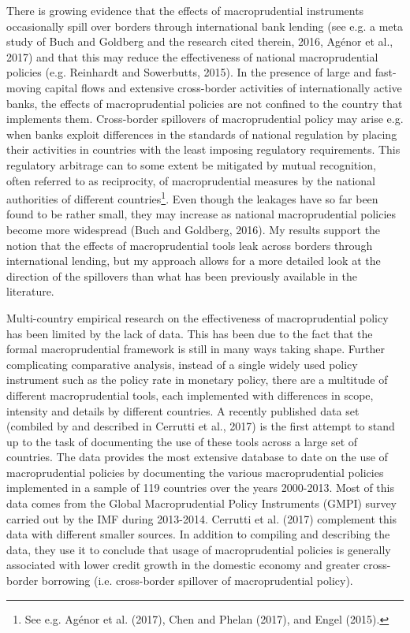 \documentclass[12pt,a4paper]{article}
\begin{document}
There is growing evidence that the effects of macroprudential instruments occasionally spill over borders through international bank lending (see e.g. a meta study of Buch and Goldberg and the research cited therein, 2016, Agénor et al., 2017) and that this may reduce the effectiveness of national macroprudential policies (e.g. Reinhardt and Sowerbutts, 2015). In the presence of large and fast-moving capital flows and extensive cross-border activities of internationally active banks, the effects of macroprudential policies are not confined to the country that implements them. Cross-border spillovers of macroprudential policy may arise e.g. when banks exploit differences in the standards of national regulation by placing their activities in countries with the least imposing regulatory requirements. This regulatory arbitrage can to some extent be mitigated by mutual recognition, often referred to as reciprocity, of macroprudential measures by the national authorities of different countries\footnote{See e.g. Agénor et al. (2017), Chen and Phelan (2017), and Engel (2015).}. Even though the leakages have so far been found to be rather small, they may increase as national macroprudential policies become more widespread (Buch and Goldberg, 2016). My results support the notion that the effects of macroprudential tools leak across borders through international lending, but my approach allows for a more detailed look at the direction of the spillovers than what has been previously available in the literature.

Multi-country empirical research on the effectiveness of macroprudential policy has been limited by the lack of data. This has been due to the fact that the formal macroprudential framework is still in many ways taking shape. Further complicating comparative analysis, instead of a single widely used policy instrument such as the policy rate in monetary policy, there are a multitude of different macroprudential tools, each implemented with differences in scope, intensity and details by different countries. A recently published data set (combiled by and described in Cerrutti et al., 2017) is the first attempt to stand up to the task of documenting the use of these tools across a large set of countries. The data provides the most extensive database to date on the use of macroprudential policies by documenting the various macroprudential policies implemented in a sample of 119 countries over the years 2000-2013. Most of this data comes from the Global Macroprudential Policy Instruments (GMPI) survey carried out by the IMF during 2013-2014. Cerrutti et al. (2017) complement this data with different smaller sources. In addition to compiling and describing the data, they use it to conclude that usage of macroprudential policies is generally associated with lower credit growth in the domestic economy and greater cross-border borrowing (i.e. cross-border spillover of macroprudential policy).
\end{document}

